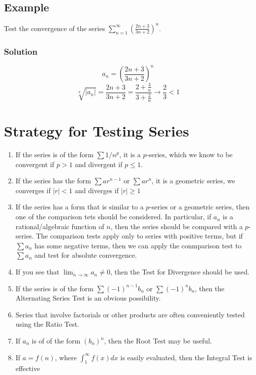 \subsection*{Example}
Test the convergence of the series $\sum^\infty_{n = 1} (\frac{2n + 3}{3n + 2})^n$.
\subsubsection*{Solution}
$$a_n = (\frac{2n + 3}{3n + 2})^n$$ $$\sqrt[n]{|a_n|} = \frac{2n + 3}{3n + 2} = \frac{2 + \frac{3}{n}}{3 + \frac{2}{n}}\rightarrow \frac{2}{3} < 1$$

\section{Strategy for Testing Series}
\begin{enumerate}
    \item If the series is of the form $\textstyle\sum 1/n^p$, it is a $p$-series, which we know to be convergent if $p > 1$ and divergent if $p\leq 1$.
    \item If the series has the form $\textstyle\sum ar^{n - 1}$ or $\textstyle\sum ar^n$, it is a geometric series, we converges if $|r| < 1$ and diverges if $|r|\geq 1$
    \item If the series has a form that is similar to a $p$-series or a geometric series, then one of the comparison tets should be considered. In particular, if $a_n$ is a rational/algebraic function of $n$, then the series should be compared with a $p$-series. The comparison tests apply only to series with positive terms, but if $\textstyle\sum a_n$ has some negative terms, then we can apply the conmparison test to $\textstyle\sum a_n$ and test for absolute convergence.
    \item If you see that $\lim_{n\rightarrow\infty}a_n\neq 0$, then the Test for Divergence should be used. 
    \item If the series is of the form $\textstyle\sum (-1)^{n - 1}b_n$ or $\textstyle\sum (-1)^{n}b_n$, then the Alternating Series Test is an obvious possibility. 
    \item Series that involve factorials or other products are often conveniently tested using the Ratio Test. 
    \item If $a_n$ is of of the form $(b_n)^n$, then the Root Test may be useful.
    \item If $a = f(n)$, where $\int^\infty_1 f(x) dx$ is easily evaluated, then the Integral Test is effective
\end{enumerate}

